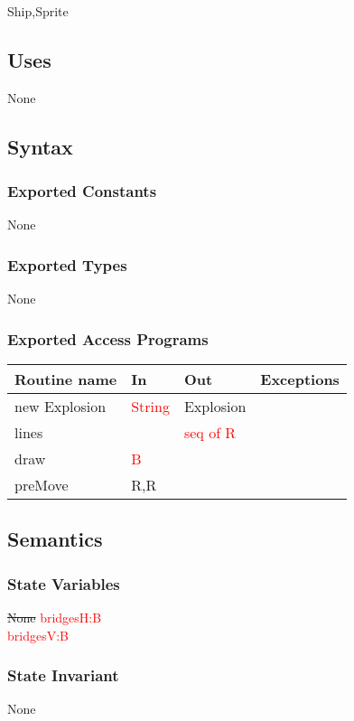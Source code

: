\documentclass[12pt]{article}
\begin{document}
Ship,Sprite

\subsection* {Uses}

None

\subsection* {Syntax}

\subsubsection* {Exported Constants}

None

\subsubsection* {Exported Types}

None 

\subsubsection* {Exported Access Programs}

\begin{tabular}{| l | l | l | p{5cm} |}
\hline
\textbf{Routine name} & \textbf{In} & \textbf{Out} & \textbf{Exceptions}\\
\hline
new Explosion & \textcolor{red}{String}  & Explosion  & ~\\
\hline
lines & ~ & \textcolor{red}{seq of R} & ~\\
\hline
draw & \textcolor{red}{B} & ~  & ~\\
\hline
preMove & R,R & ~ & ~ \\
\hline
\end{tabular}

\subsection* {Semantics}

\subsubsection* {State Variables}
\sout{None}
\textcolor{red}{bridgesH:B}\\
\textcolor{red}{bridgesV:B}


\subsubsection* {State Invariant}
None
\end{document}
